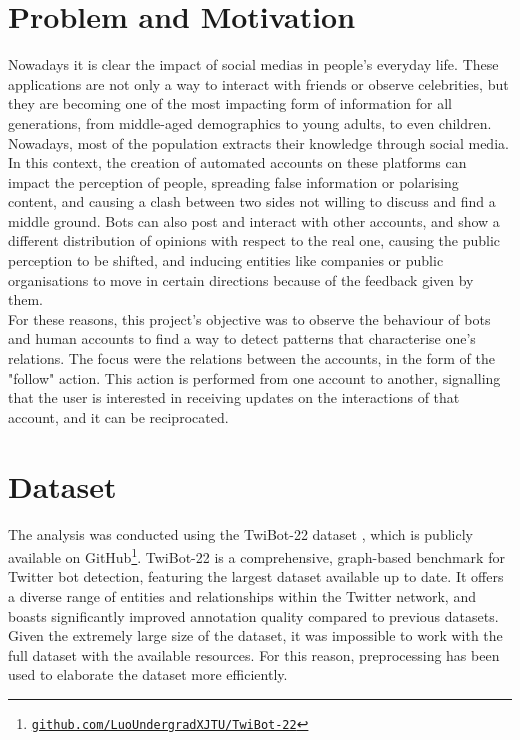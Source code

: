 \documentclass[12pt, a4paper]{article}
\begin{document}
\section{Problem and Motivation} \label{problem-and-motivation}
    Nowadays it is clear the impact of social medias in people's everyday life. These applications are not only a way to interact with friends or observe celebrities, but they are becoming one of the most impacting form of information for all generations, from middle-aged demographics to young adults, to even children.\\
    Nowadays, most of the population extracts their knowledge through social media. In this context, the creation of automated accounts on these platforms can impact the perception of people, spreading false information or polarising content, and causing a clash between two sides not willing to discuss and find a middle ground. Bots can also post and interact with other accounts, and show a different distribution of opinions with respect to the real one, causing the public perception to be shifted, and inducing entities like companies or public organisations to move in certain directions because of the feedback given by them.\\
    For these reasons, this project's objective was to observe the behaviour of bots and human accounts to find a way to detect patterns that characterise one's relations. The focus were the relations between the accounts, in the form of the "follow" action. This action is performed from one account to another, signalling that the user is interested in receiving updates on the interactions of that account, and it can be reciprocated.


\section{Dataset} \label{dataset}
	The analysis was conducted using the TwiBot-22 dataset \cite{twibot22}, which is publicly available on GitHub\footnote{\href{https://github.com/LuoUndergradXJTU/TwiBot-22}{\texttt{github.com/LuoUndergradXJTU/TwiBot-22}}}. TwiBot-22 is a comprehensive, graph-based benchmark for Twitter bot detection, featuring the largest dataset available up to date. It offers a diverse range of entities and relationships within the Twitter network, and boasts significantly improved annotation quality compared to previous datasets.\\
	Given the extremely large size of the dataset, it was impossible to work with the full dataset with the available resources. For this reason, preprocessing has been used to elaborate the dataset more efficiently.
\end{document}
